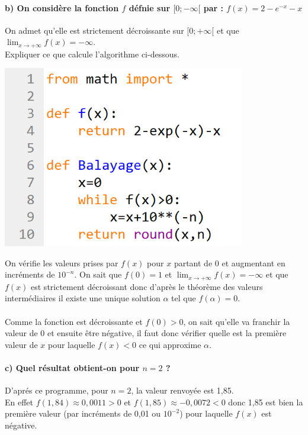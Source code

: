\documentclass[a4paper, 12pt]{article}
\begin{document}
\paragraph*{b) On considère la fonction $f$ défnie sur $[0;-\infty[$ par : $f(x)=2-e^{-x}-x$}

On admet qu'elle est strictement décroissante sur $[0;+\infty[$ et que $\displaystyle \lim_{x \to +\infty}f(x)=-\infty$.
\\
Expliquer ce que calcule l'algorithme ci-dessous.
\begin{center}
\includegraphics[width=300pt, frame]{ControleCommunMathsCodeExercice4.png}
\end{center}
On vérifie les valeurs prises par $f(x)$ pour $x$ partant de 0 et augmentant en incréments de $10^{-n}$. On sait que $f(0) = 1$ et $\displaystyle \lim_{x \to +\infty}f(x) = -\infty$ et que 
$f(x)$ est strictement décroissant donc d'après le théorème des valeurs intermédiaires il existe une unique solution $\alpha$ tel que $f(\alpha)=0$. 
\\ \\
Comme la fonction est décroissante et $f(0)>0$, on sait qu'elle va franchir la valeur de 0 et ensuite être négative, il faut donc vérifier quelle est la première valeur de $x$ 
pour laquelle $f(x)<0$ ce qui approxime $\alpha$.

{}
\paragraph*{c) Quel résultat obtient-on pour $n=2$ ?\\[5mm]}

D'aprés ce programme, pour $n=2$, la valeur renvoyée est 1,85. 
\\
En effet $f(1,84) \approx 0,0011 >0$ et $f(1,85) \approx -0,0072 < 0$ donc 1,85 est bien la première valeur (par incréments de 0,01 ou $10^{-2}$) pour laquelle $f(x)$ est négative.

\newpage
{}
\tableofcontents
\end{document}

